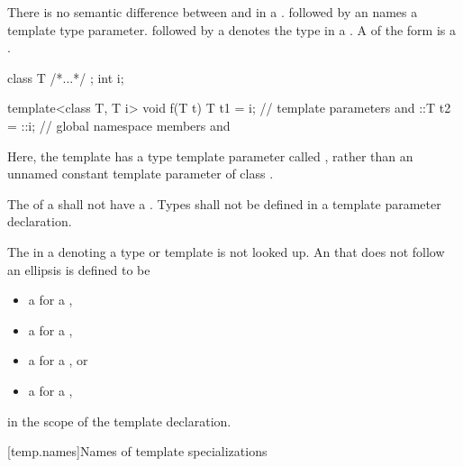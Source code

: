 \documentclass{wg21}
\begin{document}
\pnum
There is no semantic difference between
and
in a
.
followed by an
names a template type parameter.
followed by a
denotes the type in a
.
A  of the form
  is a .
\begin{example}
    \begin{codeblock}
        class T { /*...*/ };
        int i;

        template<class T, T i> void f(T t) {
            T t1 = i;         // template parameters  and 
            ::T t2 = ::i;     // global namespace members  and 
        }
    \end{codeblock}
    Here, the template  has a type template parameter
    called , rather than an unnamed constant
    template parameter of class .
\end{example}
The  of a 
shall not have a .
Types shall not be defined in a template parameter
declaration.

\pnum
The  in
a  denoting a type or template
is not looked up.
An  that does not follow an ellipsis
is defined to be
\begin{itemize}
    \item
    a  for a ,
    \item
    a  for a ,
    \item
    a  for a , or
    \item
    a  for a ,
\end{itemize}
in the scope of the template declaration.

[temp.names]{Names of template specializations}
\end{document}
